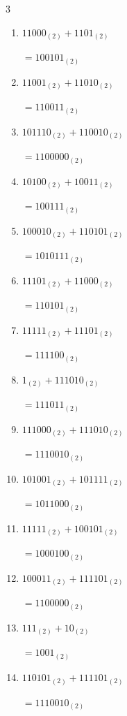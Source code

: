 \begin{multicols}{3}
\begin{enumerate}
  \item $11000_{(2)} + 1101_{(2)}$

        $=100101_{(2)}$

  \item $11001_{(2)} + 11010_{(2)}$

        $=110011_{(2)}$

  \item $101110_{(2)} + 110010_{(2)}$

        $=1100000_{(2)}$

  \item $10100_{(2)} + 10011_{(2)}$

        $=100111_{(2)}$

\columnbreak %

  \item $100010_{(2)} + 110101_{(2)}$

        $=1010111_{(2)}$

  \item $11101_{(2)} + 11000_{(2)}$

        $=110101_{(2)}$

  \item $11111_{(2)} + 11101_{(2)}$

        $=111100_{(2)}$

  \item $1_{(2)} + 111010_{(2)}$

        $=111011_{(2)}$

  \item $111000_{(2)} + 111010_{(2)}$

        $=1110010_{(2)}$

  \item $101001_{(2)} + 101111_{(2)}$

        $=1011000_{(2)}$

  \item $11111_{(2)} + 100101_{(2)}$

        $=1000100_{(2)}$

  \item $100011_{(2)} + 111101_{(2)}$

        $=1100000_{(2)}$

  \item $111_{(2)} + 10_{(2)}$

        $=1001_{(2)}$

  \item $110101_{(2)} + 111101_{(2)}$

        $=1110010_{(2)}$


\end{enumerate}
\end{multicols}
